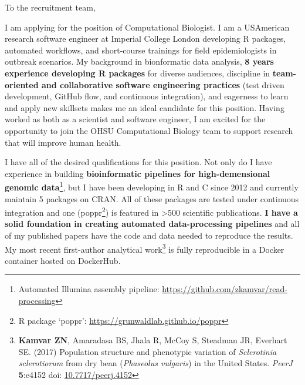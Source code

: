 



\vspace{1ex}
To the recruitment team,

\vspace{1ex}

I am applying for the position of Computational Biologist. I am a USAmerican
research software engineer at Imperial College London developing R packages,
automated workflows, and short-course trainings for field epidemiologists in
outbreak scenarios. My background in bionformatic data analysis, \textbf{8
years experience developing R packages} for diverse audiences, discipline in
\textbf{team-oriented and collaborative software engineering practices} (test
driven development, GitHub flow, and continuous integration), and eagerness to
learn and apply new skillsets makes me an ideal candidate for this position.
Having worked as both as a scientist and software engineer, I am excited for
the opportunity to join the OHSU Computational Biology team to support research
that will improve human health.

\vspace{1ex}

I have all of the desired qualifications for this position. Not only do I have
experience in building \textbf{bioinformatic pipelines for high-demensional
genomic data}\footnote{Automated Illumina assembly pipeline:
\url{https://github.com/zkamvar/read-processing}}, but I have been developing
in R and C since 2012 and currently maintain 5 packages on CRAN. All of these
packages are tested under continuous integration and one (poppr\footnote{R
package `poppr': \url{https://grunwaldlab.github.io/poppr}}) is featured in
\textgreater500 scientific publications. \textbf{I have a solid foundation in
creating automated data-processing pipelines} and all of my published papers
have the code and data needed to reproduce the results. My most recent
first-author analytical work\footnote{\textbf{Kamvar ZN}, Amaradasa BS, Jhala
R, McCoy S, Steadman JR, Everhart SE. (2017) Population structure and
phenotypic variation of \textit{Sclerotinia sclerotiorum} from dry bean
(\textit{Phaseolus vulgaris}) in the United States. \textit{PeerJ}
\textbf{5}:e4152 doi:
\href{https://doi.org/10.7717/peerj.4152}{10.7717/peerj.4152}} is fully
reproducible in a Docker container hosted on DockerHub.

